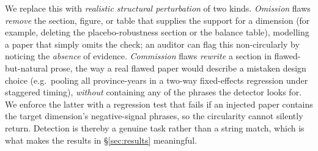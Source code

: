 We replace this with \emph{realistic structural perturbation} of two kinds.
\emph{Omission} flaws \emph{remove} the section, figure, or table that supplies
the support for a dimension (for example, deleting the placebo-robustness section
or the balance table), modelling a paper that simply omits the check; an auditor
can flag this non-circularly by noticing the \emph{absence} of evidence.
\emph{Commission} flaws \emph{rewrite} a section in flawed-but-natural prose, the
way a real flawed paper would describe a mistaken design choice (e.g.\ pooling
all province-years in a two-way fixed-effects regression under staggered timing),
\emph{without} containing any of the phrases the detector looks for. We enforce
the latter with a regression test that fails if an injected paper contains the
target dimension's negative-signal phrases, so the circularity cannot silently
return. Detection is thereby a genuine task rather than a string match, which is
what makes the results in \S\ref{sec:results} meaningful.
